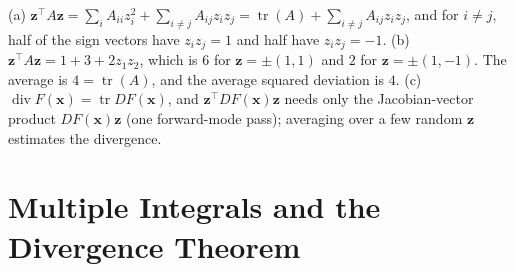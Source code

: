 \documentclass[11pt]{article}
\DeclareMathOperator{\tr}{tr}
\DeclareMathOperator{\Div}{div}
\begin{document}
\begin{description}[leftmargin=0pt, itemsep=0.3em]
    \item[\ref{pr:hutchinson}.] (a) $\mathbf{z}^\top A\mathbf{z} = \sum_i A_{ii}z_i^2 + \sum_{i \neq j} A_{ij}z_iz_j = \tr(A) + \sum_{i \neq j} A_{ij}z_iz_j$, and for $i \neq j$, half of the sign vectors have $z_iz_j = 1$ and half have $z_iz_j = -1$. (b) $\mathbf{z}^\top A\mathbf{z} = 1 + 3 + 2z_1z_2$, which is $6$ for $\mathbf{z} = \pm(1, 1)$ and $2$ for $\mathbf{z} = \pm(1, -1)$. The average is $4 = \tr(A)$, and the average squared deviation is $4$. (c) $\Div F(\mathbf{x}) = \tr DF(\mathbf{x})$, and $\mathbf{z}^\top DF(\mathbf{x})\mathbf{z}$ needs only the Jacobian-vector product $DF(\mathbf{x})\mathbf{z}$ (one forward-mode pass); averaging over a few random $\mathbf{z}$ estimates the divergence.
\end{description}

\section*{Multiple Integrals and the Divergence Theorem}
\end{document}
